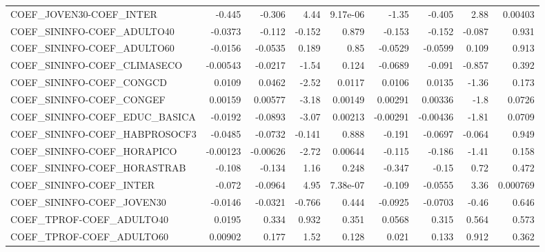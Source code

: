 \begin{tabular}{lrrrrrrrr}
COEF\_JOVEN30-COEF\_INTER                &      -0.445 &       -0.306 &     4.44 & 9.17e-06 &      -1.35 &      -0.405 &         2.88 &       0.00403 \\
COEF\_SININFO-COEF\_ADULTO40             &     -0.0373 &       -0.112 &   -0.152 &    0.879 &     -0.153 &      -0.152 &       -0.087 &         0.931 \\
COEF\_SININFO-COEF\_ADULTO60             &     -0.0156 &      -0.0535 &    0.189 &     0.85 &    -0.0529 &     -0.0599 &        0.109 &         0.913 \\
COEF\_SININFO-COEF\_CLIMASECO            &    -0.00543 &      -0.0217 &    -1.54 &    0.124 &    -0.0689 &      -0.091 &       -0.857 &         0.392 \\
COEF\_SININFO-COEF\_CONGCD               &      0.0109 &       0.0462 &    -2.52 &   0.0117 &     0.0106 &      0.0135 &        -1.36 &         0.173 \\
COEF\_SININFO-COEF\_CONGEF               &     0.00159 &      0.00577 &    -3.18 &  0.00149 &    0.00291 &     0.00336 &         -1.8 &        0.0726 \\
COEF\_SININFO-COEF\_EDUC\_BASICA          &     -0.0192 &      -0.0893 &    -3.07 &  0.00213 &   -0.00291 &    -0.00436 &        -1.81 &        0.0709 \\
COEF\_SININFO-COEF\_HABPROSOCF3          &     -0.0485 &      -0.0732 &   -0.141 &    0.888 &     -0.191 &     -0.0697 &       -0.064 &         0.949 \\
COEF\_SININFO-COEF\_HORAPICO             &    -0.00123 &     -0.00626 &    -2.72 &  0.00644 &     -0.115 &      -0.186 &        -1.41 &         0.158 \\
COEF\_SININFO-COEF\_HORASTRAB            &      -0.108 &       -0.134 &     1.16 &    0.248 &     -0.347 &       -0.15 &         0.72 &         0.472 \\
COEF\_SININFO-COEF\_INTER                &      -0.072 &      -0.0964 &     4.95 & 7.38e-07 &     -0.109 &     -0.0555 &         3.36 &      0.000769 \\
COEF\_SININFO-COEF\_JOVEN30              &     -0.0146 &      -0.0321 &   -0.766 &    0.444 &    -0.0925 &     -0.0703 &        -0.46 &         0.646 \\
COEF\_TPROF-COEF\_ADULTO40               &      0.0195 &        0.334 &    0.932 &    0.351 &     0.0568 &       0.315 &        0.564 &         0.573 \\
COEF\_TPROF-COEF\_ADULTO60               &     0.00902 &        0.177 &     1.52 &    0.128 &      0.021 &       0.133 &        0.912 &         0.362 \\

\end{tabular}
